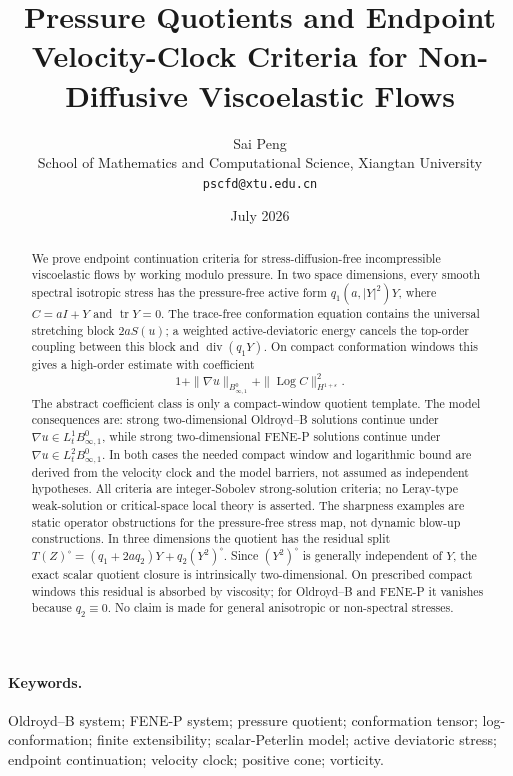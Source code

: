 \documentclass[11pt]{article}
\title{Pressure Quotients and Endpoint Velocity-Clock Criteria for Non-Diffusive Viscoelastic Flows}
\author{Sai Peng\\
School of Mathematics and Computational Science, Xiangtan University\\
\texttt{pscfd@xtu.edu.cn}}
\date{July 2026}
\newcommand{\tr}{\operatorname{tr}}
\newcommand{\Log}{\operatorname{Log}}
\begin{document}
\maketitle



\begin{abstract}
We prove endpoint continuation criteria for stress-diffusion-free
incompressible viscoelastic flows by working modulo pressure.  In two space
dimensions, every smooth spectral isotropic stress has the pressure-free active
form \(q_1(a,|Y|^2)Y\), where \(C=aI+Y\) and \(\tr Y=0\).  The trace-free
conformation equation contains the universal stretching block \(2aS(u)\); a
weighted active-deviatoric energy cancels the top-order coupling between this
block and \(\operatorname{div}(q_1Y)\).  On compact conformation windows this gives
a high-order estimate with coefficient
\[
  1+\|\nabla u\|_{B^0_{\infty,1}}+\|\Log C\|_{H^{1+\varepsilon}}^2 .
\]
The abstract coefficient class is only a compact-window quotient template.  The
model consequences are: strong two-dimensional Oldroyd--B solutions continue
under \(\nabla u\in L^1_tB^0_{\infty,1}\), while strong two-dimensional FENE-P
solutions continue under \(\nabla u\in L^2_tB^0_{\infty,1}\).  In both cases the
needed compact window and logarithmic bound are derived from the velocity clock
and the model barriers, not assumed as independent hypotheses.  All criteria are
integer-Sobolev strong-solution criteria; no Leray-type weak-solution or
critical-space local theory is asserted.  The sharpness examples are static
operator obstructions for the pressure-free stress map, not dynamic blow-up
constructions.  In three dimensions the quotient has the residual split
\(T(Z)^\circ=(q_1+2aq_2)Y+q_2(Y^2)^\circ\).  Since \((Y^2)^\circ\) is generally
independent of \(Y\), the exact scalar quotient closure is intrinsically
two-dimensional.  On prescribed compact windows this residual is absorbed by
viscosity; for Oldroyd--B and FENE-P it vanishes because \(q_2\equiv0\).  No
claim is made for general anisotropic or non-spectral stresses.
\end{abstract}

\paragraph{Keywords.}
Oldroyd--B system; FENE-P system; pressure quotient; conformation tensor;
log-conformation; finite extensibility; scalar-Peterlin model; active
deviatoric stress; endpoint continuation; velocity clock; positive cone;
vorticity.
\end{document}
